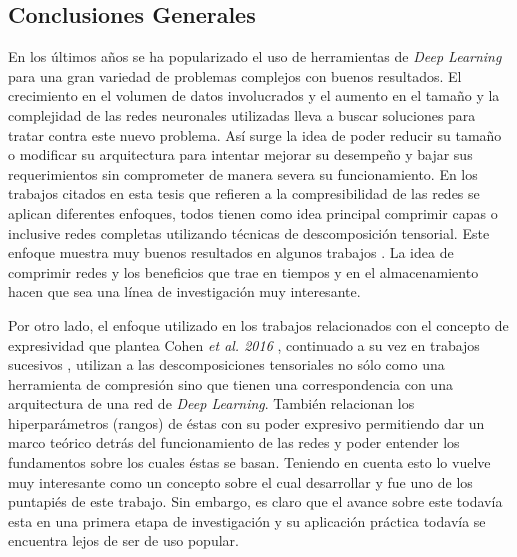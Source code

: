 \documentclass[spanish]{article}
\theoremstyle{definition}
\theoremstyle{remark}
\numberwithin{equation}{section}
\numberwithin{equation}{section} %
\begin{document}
\subsection{Conclusiones Generales}
En los últimos años se ha popularizado el uso de herramientas de \textit{Deep Learning} para una gran variedad de problemas complejos con buenos resultados. El crecimiento en el volumen de datos involucrados y el aumento en el tamaño y la complejidad de las redes neuronales utilizadas lleva a buscar soluciones para tratar contra este nuevo problema. Así surge la idea de poder reducir su tamaño o modificar su arquitectura para intentar mejorar su desempeño y bajar sus requerimientos sin comprometer de manera severa su funcionamiento. En los trabajos citados en esta tesis que refieren a la compresibilidad de las redes se aplican diferentes enfoques, todos tienen como idea principal comprimir capas o inclusive redes completas utilizando técnicas de descomposición tensorial. Este enfoque muestra muy buenos resultados en algunos trabajos \cite{lebedev2014speeding,novikov2015tensorizing,garipov2016ultimate}. La idea de comprimir redes y los beneficios que trae en tiempos y en el almacenamiento hacen que sea una línea de investigación muy interesante.       
\par
Por otro lado, el enfoque utilizado en los trabajos relacionados con el concepto de expresividad que plantea Cohen \textit{et al. 2016} \cite{cohen2016expressive}, continuado a su vez en trabajos sucesivos \cite{cohen2016convolutional,khrulkov2017expressive,khrulkov2019generalized}, utilizan a las descomposiciones tensoriales no sólo como una herramienta de compresión sino que tienen una correspondencia con una arquitectura de una red de \textit{Deep Learning}. También relacionan los hiperparámetros (rangos) de éstas con su poder expresivo permitiendo dar un marco teórico detrás del funcionamiento de las redes y poder entender los fundamentos sobre los cuales éstas se basan. Teniendo en cuenta esto lo vuelve muy interesante como un concepto sobre el cual desarrollar y fue uno de los puntapiés de este trabajo. Sin embargo, es claro que el avance sobre este todavía esta en una primera etapa de investigación y su aplicación práctica todavía se encuentra lejos de ser de uso popular.
\par


\par
\end{document}
